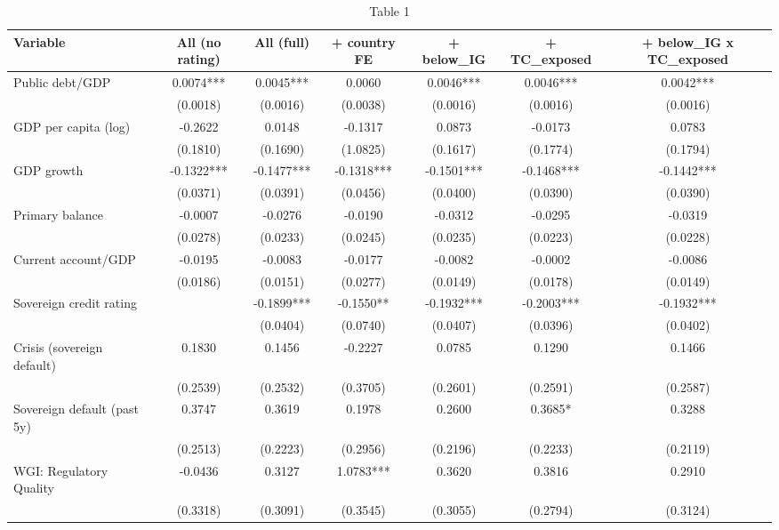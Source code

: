 \documentclass[10pt]{article}
\begin{document}
\thispagestyle{empty}
\begin{table}[h!]
  \centering
  \scriptsize
  \caption{Table 1}
  \label{coupon-table1-iso-dummies}
  \begin{threeparttable}
  \begin{tabular}{lcccccc}
    \toprule
    Variable & All (no rating) & All (full) & + country FE & + below\_IG & + TC\_exposed & + below\_IG x TC\_exposed \\
    \midrule
    Public debt/GDP & 0.0074*** & 0.0045*** & 0.0060 & 0.0046*** & 0.0046*** & 0.0042*** \\
     & (0.0018) & (0.0016) & (0.0038) & (0.0016) & (0.0016) & (0.0016) \\[2pt]
    GDP per capita (log) & -0.2622 & 0.0148 & -0.1317 & 0.0873 & -0.0173 & 0.0783 \\
     & (0.1810) & (0.1690) & (1.0825) & (0.1617) & (0.1774) & (0.1794) \\[2pt]
    GDP growth & -0.1322*** & -0.1477*** & -0.1318*** & -0.1501*** & -0.1468*** & -0.1442*** \\
     & (0.0371) & (0.0391) & (0.0456) & (0.0400) & (0.0390) & (0.0390) \\[2pt]
    Primary balance & -0.0007 & -0.0276 & -0.0190 & -0.0312 & -0.0295 & -0.0319 \\
     & (0.0278) & (0.0233) & (0.0245) & (0.0235) & (0.0223) & (0.0228) \\[2pt]
    Current account/GDP & -0.0195 & -0.0083 & -0.0177 & -0.0082 & -0.0002 & -0.0086 \\
     & (0.0186) & (0.0151) & (0.0277) & (0.0149) & (0.0178) & (0.0149) \\[2pt]
    Sovereign credit rating &  & -0.1899*** & -0.1550** & -0.1932*** & -0.2003*** & -0.1932*** \\
     &  & (0.0404) & (0.0740) & (0.0407) & (0.0396) & (0.0402) \\[2pt]
    Crisis (sovereign default) & 0.1830 & 0.1456 & -0.2227 & 0.0785 & 0.1290 & 0.1466 \\
     & (0.2539) & (0.2532) & (0.3705) & (0.2601) & (0.2591) & (0.2587) \\[2pt]
    Sovereign default (past 5y) & 0.3747 & 0.3619 & 0.1978 & 0.2600 & 0.3685* & 0.3288 \\
     & (0.2513) & (0.2223) & (0.2956) & (0.2196) & (0.2233) & (0.2119) \\[2pt]
    WGI: Regulatory Quality & -0.0436 & 0.3127 & 1.0783*** & 0.3620 & 0.3816 & 0.2910 \\
     & (0.3318) & (0.3091) & (0.3545) & (0.3055) & (0.2794) & (0.3124) \\[2pt]

\end{tabular}
\end{threeparttable}
\end{table}
\end{document}
